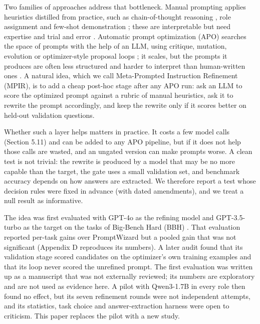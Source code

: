 \documentclass{ieeeaccess}
\begin{document}
Two families of approaches address that bottleneck. Manual prompting applies heuristics distilled from practice, such as chain-of-thought reasoning \cite{wei2022}, role assignment \cite{kong2024} and few-shot demonstration \cite{brown2020}; these are interpretable but need expertise and trial and error \cite{zamfirescupereira2023,reynolds2021}. Automatic prompt optimization (APO) searches the space of prompts with the help of an LLM, using critique, mutation, evolution or optimizer-style proposal loops \cite{zhou2023,pryzant2023,guo2024,yang2024,agarwal2025}; it scales, but the prompts it produces are often less structured and harder to interpret than human-written ones \cite{ramnath2025}. A natural idea, which we call Meta-Prompted Instruction Refinement (MPIR), is to add a cheap post-hoc stage after any APO run: ask an LLM to score the optimized prompt against a rubric of manual heuristics, ask it to rewrite the prompt accordingly, and keep the rewrite only if it scores better on held-out validation questions.

Whether such a layer helps matters in practice. It costs a few model calls (Section 5.11) and can be added to any APO pipeline, but if it does not help those calls are wasted, and an ungated version can make prompts worse. A clean test is not trivial: the rewrite is produced by a model that may be no more capable than the target, the gate uses a small validation set, and benchmark accuracy depends on how answers are extracted. We therefore report a test whose decision rules were fixed in advance (with dated amendments), and we treat a null result as informative.

The idea was first evaluated with GPT-4o as the refining model and GPT-3.5-turbo as the target on the tasks of Big-Bench Hard (BBH) \cite{suzgun2023}. That evaluation reported per-task gains over PromptWizard \cite{agarwal2025} but a pooled gain that was not significant (Appendix D reproduces its numbers). A later audit found that its validation stage scored candidates on the optimizer's own training examples and that its loop never scored the unrefined prompt. The first evaluation was written up as a manuscript that was not externally reviewed; its numbers are exploratory and are not used as evidence here. A pilot with Qwen3-1.7B in every role then found no effect, but its seven refinement rounds were not independent attempts, and its statistics, task choice and answer-extraction harness were open to criticism. This paper replaces the pilot with a new study.
\end{document}
